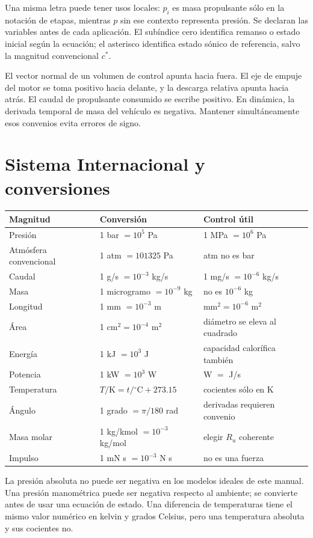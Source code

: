Una misma letra puede tener usos locales: $p_i$ es masa propulsante sólo en la notación de etapas, mientras $p$ sin ese contexto representa presión. Se declaran las variables antes de cada aplicación. El subíndice cero identifica remanso o estado inicial según la ecuación; el asterisco identifica estado sónico de referencia, salvo la magnitud convencional $c^*$.

El vector normal de un volumen de control apunta hacia fuera. El eje de empuje del motor se toma positivo hacia delante, y la descarga relativa apunta hacia atrás. El caudal de propulsante consumido se escribe positivo. En dinámica, la derivada temporal de masa del vehículo es negativa. Mantener simultáneamente esos convenios evita errores de signo.
\chapter{Sistema Internacional y conversiones}\label{app:si}
\begin{center}\begin{tabular}{lll}\toprule
Magnitud & Conversión & Control útil\\\midrule
Presión & 1 bar $=10^5$ Pa & 1 MPa $=10^6$ Pa\\
Atmósfera convencional & 1 atm $=101325$ Pa & atm no es bar\\
Caudal & 1 g/s $=10^{-3}$ kg/s & 1 mg/s $=10^{-6}$ kg/s\\
Masa & 1 microgramo $=10^{-9}$ kg & no es $10^{-6}$ kg\\
Longitud & 1 mm $=10^{-3}$ m & mm$^2=10^{-6}$ m$^2$\\
Área & 1 cm$^2=10^{-4}$ m$^2$ & diámetro se eleva al cuadrado\\
Energía & 1 kJ $=10^3$ J & capacidad calorífica también\\
Potencia & 1 kW $=10^3$ W & W $=$ J/s\\
Temperatura & $T/\mathrm K=t/{}^\circ\mathrm C+273.15$ & cocientes sólo en K\\
Ángulo & 1 grado $=\pi/180$ rad & derivadas requieren convenio\\
Masa molar & 1 kg/kmol $=10^{-3}$ kg/mol & elegir $R_u$ coherente\\
Impulso & 1 mN s $=10^{-3}$ N s & no es una fuerza\\\bottomrule
\end{tabular}\end{center}
La presión absoluta no puede ser negativa en los modelos ideales de este manual. Una presión manométrica puede ser negativa respecto al ambiente; se convierte antes de usar una ecuación de estado. Una diferencia de temperaturas tiene el mismo valor numérico en kelvin y grados Celsius, pero una temperatura absoluta y sus cocientes no.

